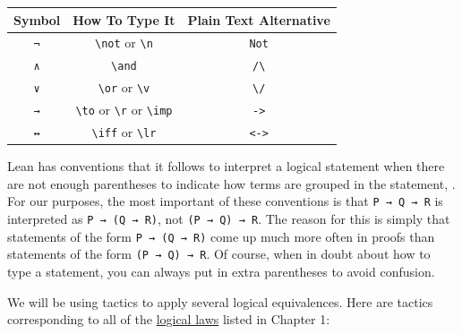 \documentclass[
  letterpaper,
  DIV=11,
  numbers=noendperiod]{scrreprt}
\newcommand{\excl}[1]{}
\begin{document}
\begin{longtable}[]{@{}ccc@{}}
\toprule()
Symbol & How To Type It & Plain Text Alternative \\
\midrule()
\endhead
\texttt{¬} & \texttt{\textbackslash{}not} or \texttt{\textbackslash{}n}
& \texttt{Not} \\
\texttt{∧} & \texttt{\textbackslash{}and} &
\texttt{/\textbackslash{}} \\
\texttt{∨} & \texttt{\textbackslash{}or} or \texttt{\textbackslash{}v} &
\texttt{\textbackslash{}/} \\
\texttt{→} & \texttt{\textbackslash{}to} or \texttt{\textbackslash{}r}
or \texttt{\textbackslash{}imp} &
\excl{\texttt{-\textgreater{}}}\texttt{-\null>} \\
\texttt{↔} & \texttt{\textbackslash{}iff} or \texttt{\textbackslash{}lr}
& \excl{\texttt{\textless{}-\textgreater{}}}\texttt{<-\null>} \\
\bottomrule()
\end{longtable}

Lean has conventions that it follows to interpret a logical statement
when there are not enough parentheses to indicate how terms are grouped
in the statement, . For our purposes, the most important of these
conventions is that \texttt{P\ →\ Q\ →\ R} is interpreted as
\texttt{P\ →\ (Q\ →\ R)}, not \texttt{(P\ →\ Q)\ →\ R}. The reason for
this is simply that statements of the form \texttt{P\ →\ (Q\ →\ R)} come
up much more often in proofs than statements of the form
\texttt{(P\ →\ Q)\ →\ R}. Of course, when in doubt about how to type a
statement, you can always put in extra parentheses to avoid confusion.

We will be using tactics to apply several logical equivalences. Here are
tactics corresponding to all of the
\protect\hyperlink{prop-laws}{logical laws} listed in Chapter 1:
\end{document}
